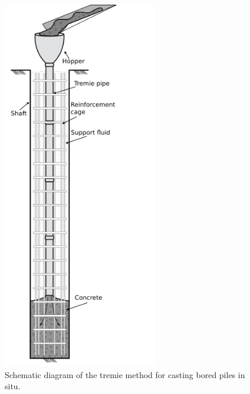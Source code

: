 \begin{figure}[H]
\centering
\includegraphics[width=0.6\textwidth]{tremie_empty.png}
\caption{\label{fig:tremie_blank} Schematic diagram of the tremie method for casting bored piles in situ.}
\end{figure}

